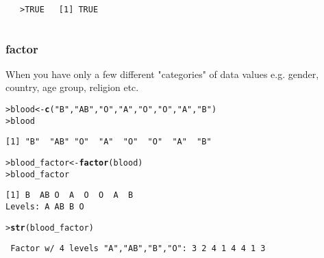\documentclass[13pt,aspectratio=169]{beamer}\usepackage[]{graphicx}\usepackage[]{color}
\makeatletter
\newcommand{\hlnum}[1]{\textcolor[rgb]{0.686,0.059,0.569}{#1}}%
\newcommand{\hlstr}[1]{\textcolor[rgb]{0.192,0.494,0.8}{#1}}%
\newcommand{\hlstd}[1]{\textcolor[rgb]{0.345,0.345,0.345}{#1}}%
\newcommand{\hlkwb}[1]{\textcolor[rgb]{0.69,0.353,0.396}{#1}}%
\newcommand{\hlkwd}[1]{\textcolor[rgb]{0.737,0.353,0.396}{\textbf{#1}}}%
\newenvironment{kframe}{%
 \def\at@end@of@kframe{}%
 \ifinner\ifhmode%
  \def\at@end@of@kframe{\end{minipage}}%
  \begin{minipage}{\columnwidth}%
 \fi\fi%
 \def\FrameCommand##1{\hskip\@totalleftmargin \hskip-\fboxsep
 \colorbox{shadecolor}{##1}\hskip-\fboxsep
     \hskip-\linewidth \hskip-\@totalleftmargin \hskip\columnwidth}%
 \MakeFramed {\advance\hsize-\width
   \@totalleftmargin\z@ \linewidth\hsize
   \@setminipage}}%
 {\par\unskip\endMakeFramed%
 \at@end@of@kframe}
\newenvironment{knitrout}{}{} %
\renewenvironment{knitrout}{\setlength{\topsep}{0mm}}{}
\makeatother
\begin{document}
\begin{frame}[fragile]
\begin{columns}[t]
\begin{knitrout}
\begin{kframe}
{\ttfamily\noindent\bfseries{}}\begin{alltt}
\hlstd{> }\hlnum{TRUE}
\end{alltt}
\begin{verbatim}
[1] TRUE
\end{verbatim}
\end{kframe}
\end{knitrout}
    \end{columns}
\end{frame}

\begin{frame}[fragile]
    \frametitle{factor}
When you have only a few different "categories" of data values
\vskip6pt
e.g. gender, country, age group, religion etc.
\vskip6pt
\begin{knitrout}\small
{}\color{fgcolor}\begin{kframe}
\begin{alltt}
\hlstd{> }\hlstd{blood} \hlkwb{<-} \hlkwd{c}\hlstd{(}\hlstr{"B"}\hlstd{,} \hlstr{"AB"}\hlstd{,} \hlstr{"O"}\hlstd{,} \hlstr{"A"}\hlstd{,} \hlstr{"O"}\hlstd{,} \hlstr{"O"}\hlstd{,} \hlstr{"A"}\hlstd{,} \hlstr{"B"}\hlstd{)}
\hlstd{> }\hlstd{blood}
\end{alltt}
\begin{verbatim}
[1] "B"  "AB" "O"  "A"  "O"  "O"  "A"  "B" 
\end{verbatim}
\begin{alltt}
\hlstd{> }\hlstd{blood_factor} \hlkwb{<-} \hlkwd{factor}\hlstd{(blood)}
\hlstd{> }\hlstd{blood_factor}
\end{alltt}
\begin{verbatim}
[1] B  AB O  A  O  O  A  B 
Levels: A AB B O
\end{verbatim}
\begin{alltt}
\hlstd{> }\hlkwd{str}\hlstd{(blood_factor)}
\end{alltt}
\begin{verbatim}
 Factor w/ 4 levels "A","AB","B","O": 3 2 4 1 4 4 1 3
\end{verbatim}
\end{kframe}
\end{knitrout}
\end{frame}
\end{document}
